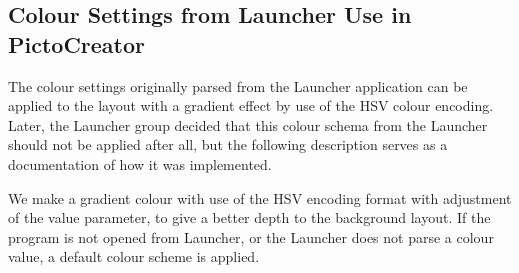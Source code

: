 \subsection{Colour Settings from Launcher Use in PictoCreator}
The colour settings originally parsed from the Launcher application can be applied to the layout with a gradient effect by use of the HSV colour encoding.
Later, the Launcher group decided that this colour schema from the Launcher should not be applied after all, but the following description serves as a documentation of how it was implemented.

We make a gradient colour with use of the HSV encoding format with adjustment of the value parameter, to give a better depth to the background layout.
If the program is not opened from Launcher, or the Launcher does not parse a colour value, a default colour scheme is applied.
